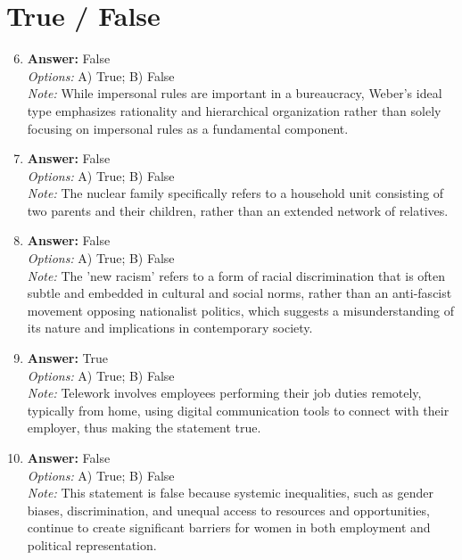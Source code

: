 \documentclass[12pt]{article}
\begin{document}
\section*{True / False}
\begin{enumerate}[label=\arabic*.]
\setcounter{enumi}{5}
\item \textbf{Answer:} False
\\ \textit{Options:} A) True; B) False
\\ \textit{Note:} While impersonal rules are important in a bureaucracy, Weber's ideal type emphasizes rationality and hierarchical organization rather than solely focusing on impersonal rules as a fundamental component.
\item \textbf{Answer:} False
\\ \textit{Options:} A) True; B) False
\\ \textit{Note:} The nuclear family specifically refers to a household unit consisting of two parents and their children, rather than an extended network of relatives.
\item \textbf{Answer:} False
\\ \textit{Options:} A) True; B) False
\\ \textit{Note:} The 'new racism' refers to a form of racial discrimination that is often subtle and embedded in cultural and social norms, rather than an anti-fascist movement opposing nationalist politics, which suggests a misunderstanding of its nature and implications in contemporary society.
\item \textbf{Answer:} True
\\ \textit{Options:} A) True; B) False
\\ \textit{Note:} Telework involves employees performing their job duties remotely, typically from home, using digital communication tools to connect with their employer, thus making the statement true.
\item \textbf{Answer:} False
\\ \textit{Options:} A) True; B) False
\\ \textit{Note:} This statement is false because systemic inequalities, such as gender biases, discrimination, and unequal access to resources and opportunities, continue to create significant barriers for women in both employment and political representation.
\end{enumerate}
\end{document}
